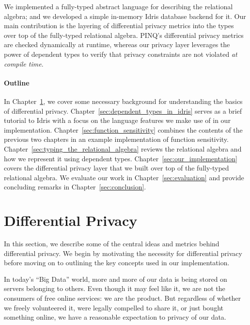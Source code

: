 \documentclass[12pt]{article}
\begin{document}
We implemented a fully-typed abstract language for describing the relational algebra; and we developed a simple in-memory Idris database backend for it.
Our main contribution is the layering of differential privacy metrics into the types over top of the fully-typed relational algebra.
PINQ's differential privacy metrics are checked dynamically at runtime, whereas our privacy layer leverages the power of dependent types to verify that privacy constraints are not violated \textit{at compile time}.


\paragraph{Outline}

In Chapter~\ref{sec:differential_privacy}, we cover some necessary background for understanding the basics of differential privacy.
Chapter~\ref{sec:dependent_types_in_idris} serves as a brief tutorial to Idris with a focus on the language features we make use of in our implementation.
Chapter~\ref{sec:function_sensitivity} combines the contents of the previous two chapters in an example implementation of function sensitivity.
Chapter~\ref{sec:typing_the_relational_algebra} reviews the relational algebra and how we represent it using dependent types.
Chapter~\ref{sec:our_implementation} covers the differential privacy layer that we built over top of the fully-typed relational algebra.
We evaluate our work in Chapter~\ref{sec:evaluation} and provide concluding remarks in Chapter~\ref{sec:conclusion}.

\section{Differential Privacy}\label{sec:differential_privacy}

In this section, we describe some of the central ideas and metrics behind differential privacy.
We begin by motivating the necessity for differential privacy before moving on to outlining the key concepts used in our implementation.


In today's ``Big Data'' world, more and more of our data is being stored on servers belonging to others.
Even though it may feel like it, we are not the consumers of free online services: we are the product.
But regardless of whether we freely volunteered it, were legally compelled to share it, or just bought something online, we have a reasonable expectation to privacy of our data.
\end{document}
